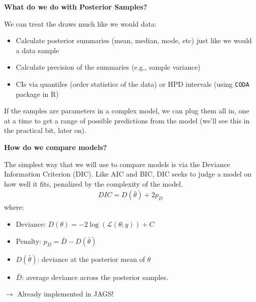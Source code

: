 \documentclass[12pt,xcolor=svgnames]{beamer}
\newcommand{\rd}{\color{red}}
\newcommand{\bl}{\color{blue}}
\newcommand{\theme}{\color{FireBrick}}
\newcommand{\sk}{\vspace{.4cm}}
\newcommand{\chap}[1]{{\theme \Large \bf #1} \sk}
\begin{document}
\begin{frame}
\chap{What do we do with Posterior Samples?}

We can treat the draws much like we would data:
\begin{itemize}
\item Calculate posterior summaries (mean, median, mode, etc) just like we would a data sample
\item Calculate precision of the summaries (e.g., sample variance)
\item CIs via quantiles (order statistics of the data) or HPD intervals (using {\tt CODA} package in R)
\end{itemize}

If the samples are parameters in a complex model, we can plug them all in, one at a time to get a range of possible predictions from the model (we'll see this in the practical bit, later on). 

\end{frame}

\begin{frame}
\chap{How do we compare models?}

The simplest way that we will use to compare models is via the {\bl Deviance Information Criterion} (DIC). Like AIC and BIC, DIC seeks to judge a model on how well it fits, penalized by the complexity of the model.
\begin{align*}
DIC = D(\bar{\theta}) + 2p_D
\end{align*}
where:
\begin{itemize}
\item Deviance: $D(\theta)=-2\log(\mathcal{L}(\theta; y)) + C$
\item Penalty: $p_D = \bar{D} -D(\bar{\theta})$
\item $D(\bar{\theta})$: deviance at the posterior mean of $\theta$
\item $\bar{D}$: average deviance across the posterior samples.
\end{itemize}
{\rd $\rightarrow$ Already implemented in JAGS!}
\end{frame}
\end{document}
